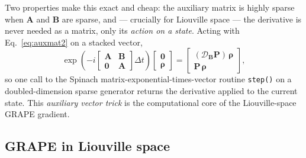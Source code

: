 \documentclass[11pt,a4paper]{article}
\newcommand{\code}[1]{\texttt{#1}}
\begin{document}
Two properties make this exact and cheap: the auxiliary matrix is highly
sparse when $\mathbf{A}$ and $\mathbf{B}$ are sparse, and --- crucially
for Liouville space --- the derivative is never needed as a matrix, only
its \emph{action on a state}. Acting with Eq.~\eqref{eq:auxmat2} on a
stacked vector,
\begin{equation}
  \exp\!\left(-i
  \begin{bmatrix}
    \mathbf{A} & \mathbf{B}\\
    \mathbf{0} & \mathbf{A}
  \end{bmatrix}\Delta t\right)
  \begin{bmatrix}\mathbf{0}\\ \boldsymbol{\rho}\end{bmatrix}
  =
  \begin{bmatrix}
    (\mathcal{D}_{\mathbf{B}}\mathbf{P})\,\boldsymbol{\rho}\\
    \mathbf{P}\,\boldsymbol{\rho}
  \end{bmatrix},
  \label{eq:auxvec}
\end{equation}
so one call to the Spinach matrix-exponential-times-vector routine
\code{step()} on a doubled-dimension sparse generator returns the
derivative applied to the current state. This \emph{auxiliary vector
trick} is the computational core of the Liouville-space GRAPE gradient.

\subsection{GRAPE in Liouville space}
\label{sec:grapeliouv}
\end{document}
